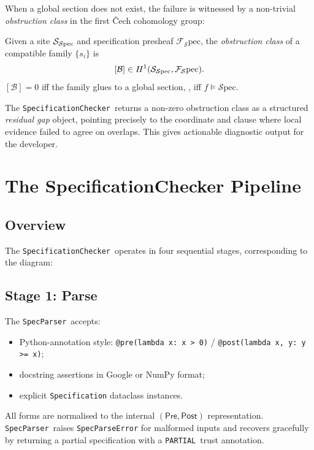 \documentclass[11pt]{article}
\newcommand{\Spec}{\mathcal{S}\mathrm{pec}}        %
\newcommand{\Pre}{\ensuremath{\mathsf{Pre}}}                     %
\newcommand{\Post}{\ensuremath{\mathsf{Post}}}                   %
\newcommand{\SpecAn}{\textsc{SpecAnalyzer}}         %
\newcommand{\Props}{\mathcal{P}}                    %
\newcommand{\CoordProps}[1]{\Props_{#1}}            %
\newcommand{\LocalSec}[1]{s_{#1}}                  %
\newcommand{\PARTIAL}{\texttt{PARTIAL}}             %
\newcommand{\SatSite}{{\Site_{\Spec}}}                %
\newcommand{\ObstrClass}{\mathcal{B}}               %
\newcommand{\SpecificationChecker}{\texttt{SpecificationChecker}}
\newcommand{\SpecParser}{\texttt{SpecParser}}
\begin{document}
When a global section does not exist, the failure is witnessed by a
non-trivial \emph{obstruction class} in the first \v{C}ech cohomology
group:

\begin{definition}\label{def:obstruction}
Given a site $\SatSite$ and specification presheaf $\mathcal{F}_\Spec$,
the \emph{obstruction class} of a compatible family
$\{\LocalSec{i}\}$ is
\[
  [\ObstrClass] \in \Hcoh{1}(\SatSite, \mathcal{F}_\Spec).
\]
$[\ObstrClass] = 0$ iff the family glues to a global section, \ie,
iff $f \models \Spec$.
\end{definition}

The \SpecificationChecker\ returns a non-zero obstruction class as a
structured \emph{residual gap} object, pointing precisely to the
coordinate and clause where local evidence failed to agree on overlaps.
This gives actionable diagnostic output for the developer.

\section{The SpecificationChecker Pipeline}\label{sec:pipeline}

\subsection{Overview}\label{sec:pipeline-overview}

The \SpecificationChecker\ operates in four sequential stages,
corresponding to the diagram:
\begin{center}
\end{center}

\subsection{Stage 1: Parse}\label{sec:parse}

The \SpecParser\ accepts:
\begin{itemize}[leftmargin=2em]
  \item Python-annotation style:
        \lstinline|@pre(lambda x: x > 0)| /
        \lstinline|@post(lambda x, y: y >= x)|;
  \item docstring assertions in Google or NumPy format;
  \item explicit \texttt{Specification} dataclass instances.
\end{itemize}
All forms are normalised to the internal $(\Pre, \Post)$ representation.
\SpecParser\ raises \texttt{SpecParseError} for malformed inputs and
recovers gracefully by returning a partial specification with a
\PARTIAL\ trust annotation.
\end{document}
